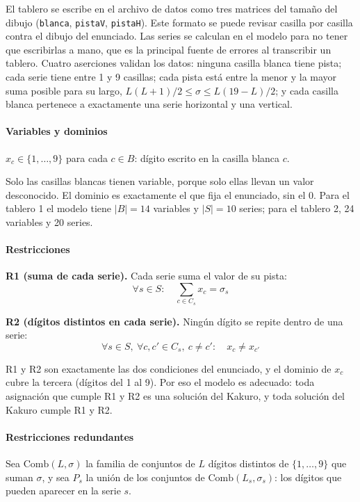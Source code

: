 El tablero se escribe en el archivo de datos como tres matrices del tamaño del dibujo (\texttt{blanca}, \texttt{pistaV}, \texttt{pistaH}). Este formato se puede revisar casilla por casilla contra el dibujo del enunciado. Las series se calculan en el modelo para no tener que escribirlas a mano, que es la principal fuente de errores al transcribir un tablero. Cuatro aserciones validan los datos: ninguna casilla blanca tiene pista; cada serie tiene entre 1 y 9 casillas; cada pista está entre la menor y la mayor suma posible para su largo, $L(L+1)/2 \le \sigma \le L(19-L)/2$; y cada casilla blanca pertenece a exactamente una serie horizontal y una vertical.

\paragraph{Variables y dominios}

$x_c \in \{1, \dots, 9\}$ para cada $c \in B$: dígito escrito en la casilla blanca $c$.

Solo las casillas blancas tienen variable, porque solo ellas llevan un valor desconocido. El dominio es exactamente el que fija el enunciado, sin el 0. Para el tablero 1 el modelo tiene $|B| = 14$ variables y $|S| = 10$ series; para el tablero 2, 24 variables y 20 series.

\paragraph{Restricciones}

\textbf{R1 (suma de cada serie).} Cada serie suma el valor de su pista:
\[
    \forall s \in S:\quad \sum_{c \in C_s} x_c = \sigma_s
\]

\textbf{R2 (dígitos distintos en cada serie).} Ningún dígito se repite dentro de una serie:
\[
    \forall s \in S,\ \forall c, c' \in C_s,\ c \neq c':\quad x_c \neq x_{c'}
\]

R1 y R2 son exactamente las dos condiciones del enunciado, y el dominio de $x_c$ cubre la tercera (dígitos del 1 al 9). Por eso el modelo es adecuado: toda asignación que cumple R1 y R2 es una solución del Kakuro, y toda solución del Kakuro cumple R1 y R2.

\paragraph{Restricciones redundantes}

Sea $\mathrm{Comb}(L, \sigma)$ la familia de conjuntos de $L$ dígitos distintos de $\{1, \dots, 9\}$ que suman $\sigma$, y sea $P_s$ la unión de los conjuntos de $\mathrm{Comb}(L_s, \sigma_s)$: los dígitos que pueden aparecer en la serie $s$.


